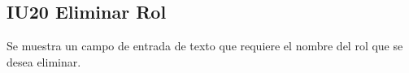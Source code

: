 \newpage
\subsection{IU20 Eliminar Rol}
	Se muestra un campo de entrada de texto que requiere el nombre del rol que se desea eliminar.
